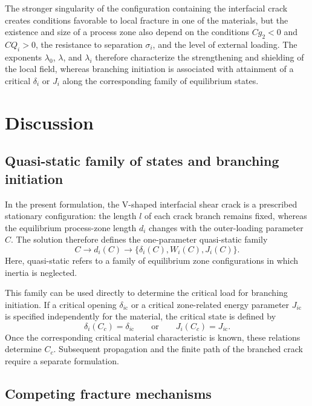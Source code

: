 \documentclass[pdflatex,iicol,sn-mathphys-ay]{sn-jnl}
\begin{document}
The stronger singularity of the configuration containing the interfacial
crack creates conditions favorable to local fracture in one of the
materials, but the existence and size of a process zone also depend on
the conditions $Cg_2<0$ and $CQ_i>0$, the resistance to separation
$\sigma_i$, and the level of external loading. The exponents
$\lambda_0$, $\lambda$, and $\lambda_i$ therefore characterize the
strengthening and shielding of the local field, whereas branching
initiation is associated with attainment of a critical $\delta_i$ or
$J_i$ along the corresponding family of equilibrium states.


\section{Discussion}
\label{sec:discussion}

\subsection{Quasi-static family of states and branching initiation}
\label{subsec:discussion-quasistatic}

In the present formulation, the V-shaped interfacial shear crack is a
prescribed stationary configuration: the length $l$ of each crack branch
remains fixed, whereas the equilibrium process-zone length $d_i$ changes
with the outer-loading parameter $C$. The solution therefore defines the
one-parameter quasi-static family
\begin{equation*}
  C\longrightarrow d_i(C)
  \longrightarrow
  \bigl\{\delta_i(C),W_i(C),J_i(C)\bigr\}.
\end{equation*}
Here, quasi-static refers to a family of equilibrium zone configurations
in which inertia is neglected.

This family can be used directly to determine the critical load for
branching initiation. If a critical opening $\delta_{i\mathrm{c}}$ or a
critical zone-related energy parameter $J_{i\mathrm{c}}$ is specified
independently for the material, the critical state is defined by
\begin{equation*}
  \delta_i(C_c)=\delta_{i\mathrm{c}}
  \qquad\text{or}\qquad
  J_i(C_c)=J_{i\mathrm{c}}.
\end{equation*}
Once the corresponding critical material characteristic is known, these
relations determine $C_c$. Subsequent propagation and the finite path of
the branched crack require a separate formulation.

\subsection{Competing fracture mechanisms}
\label{subsec:discussion-competing}
\end{document}
